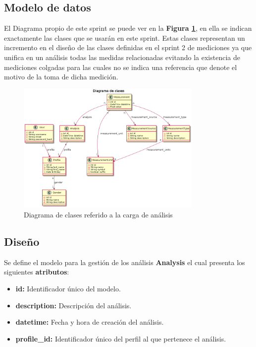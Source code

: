 \documentclass[a4paper,12pt]{article}
\begin{document}
\clearpage

\subsection{Modelo de datos}
El Diagrama propio de este sprint se puede ver en la \textbf{Figura \ref{5-diagramaClases}}, en ella se indican exactamente las clases que se usarán en este sprint. Estas clases representan un incremento en el diseño de las clases definidas en el sprint 2 de mediciones ya que unifica en un análisis todas las medidas relacionadas evitando la existencia de mediciones colgadas para las cuales no se indica una referencia que denote el motivo de la toma de dicha medición.

    \begin{figure}[h]
        \centering
        \includegraphics[width=0.8\textwidth]{img/sprint5_dc}
        \caption{Diagrama de clases referido a la carga de análisis}
		\label{5-diagramaClases}
    \end{figure}


\subsection{Diseño}

	Se define el modelo para la gestión de los análisis \textbf{Analysis} el cual presenta los siguientes \textbf{atributos}:

\begin{itemize}
	\item \textbf{id:} Identificador único del modelo.
	\item \textbf{description:} Descripción del análisis.
	\item \textbf{datetime: }	Fecha y hora de creación del análisis.	
	\item \textbf{profile\_id: } Identificador único del perfil al que pertenece el análisis.
\end{itemize}
\end{document}
